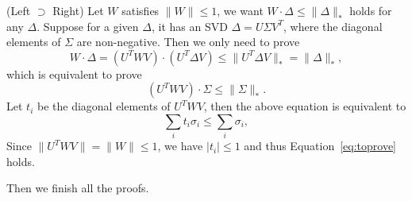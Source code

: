 (Left $\supset$ Right)
Let $W$ satisfies $\|W\|\le1$,
we want $W\cdot\Delta\le\|\Delta\|_*$ holds for any $\Delta$.
Suppose for a given $\Delta$,
it has an SVD $\Delta=U\Sigma V^T$,
where the diagonal elements of $\Sigma$ are non-negative.
Then we only need to prove
\begin{equation}
    W\cdot\Delta=(U^TWV)\cdot(U^T\Delta V)\le\|U^T\Delta V\|_*=\|\Delta\|_*,
\end{equation}
which is equivalent to prove
\begin{equation}
    (U^TWV)\cdot\Sigma\le\|\Sigma\|_*.
\end{equation}
Let $t_i$ be the diagonal elements of $U^TWV$,
then the above equation is equivalent to
\begin{equation}\label{eq:toprove}
    \sum_i t_i \sigma_i \le\sum_i \sigma_i,
\end{equation}
Since $\|U^TWV\|=\|W\|\le1$,
we have $|t_i|\le1$ and thus Equation~\eqref{eq:toprove} holds.

Then we finish all the proofs.
